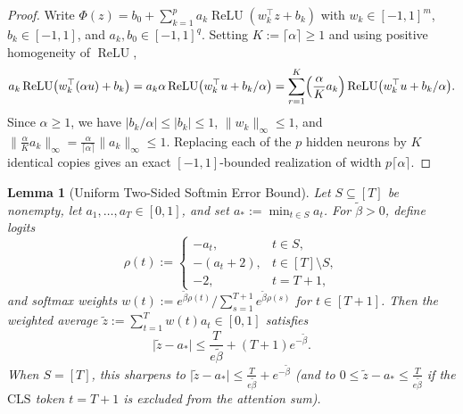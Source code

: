 \documentclass[11pt]{article}
\theoremstyle{plain}
\newtheorem{lemma}{Lemma}
\theoremstyle{definition}
\theoremstyle{remark}
\DeclareMathOperator{\ReLU}{ReLU}
\newcommand{\1}{\mathbf{1}}
\newcommand{\CLS}{\mathrm{CLS}}
\begin{document}
\begin{proof}
Write $\Phi(z) = b_0 + \sum_{k=1}^p a_k \ReLU(w_k^\top z + b_k)$ with $w_k \in [-1,1]^m$, $b_k \in [-1,1]$, and $a_k, b_0 \in [-1,1]^q$. Setting $K := \lceil \alpha \rceil \ge 1$ and using positive homogeneity of $\ReLU$,
\[
a_k \ReLU\bigl(w_k^\top(\alpha u) + b_k\bigr)
= a_k \alpha \ReLU\bigl(w_k^\top u + b_k/\alpha\bigr)
= \sum_{r=1}^K \Bigl(\frac{\alpha}{K} a_k\Bigr) \ReLU\bigl(w_k^\top u + b_k/\alpha\bigr).
\]
Since $\alpha \ge 1$, we have $|b_k/\alpha| \le |b_k| \le 1$, $\|w_k\|_\infty \le 1$, and $\|\frac{\alpha}{K} a_k\|_\infty = \frac{\alpha}{\lceil \alpha \rceil}\|a_k\|_\infty \le 1$. Replacing each of the $p$ hidden neurons by $K$ identical copies gives an exact $[-1,1]$-bounded realization of width $p\lceil \alpha \rceil$.
\end{proof}

\begin{lemma}[Uniform Two-Sided Softmin Error Bound]\label{lem:softmin}
Let $S \subseteq [T]$ be nonempty, let $a_1, \dots, a_T \in [0,1]$, and set $a_* := \min_{t \in S} a_t$. For $\tilde{\beta} > 0$, define logits
\[
\rho(t) := \begin{cases}
-a_t, & t \in S, \\
-(a_t + 2), & t \in [T] \setminus S, \\
-2, & t = T + 1,
\end{cases}
\]
and softmax weights $w(t) := e^{\tilde{\beta}\rho(t)} \big/ \sum_{s=1}^{T+1} e^{\tilde{\beta}\rho(s)}$ for $t \in [T+1]$. Then the weighted average $\tilde{z} := \sum_{t=1}^T w(t) a_t \in [0,1]$ satisfies
\[
\bigl|\tilde{z} - a_*\bigr| \le \frac{T}{e\tilde{\beta}} + (T + 1)e^{-\tilde{\beta}}.
\]
When $S = [T]$, this sharpens to $\bigl|\tilde{z} - a_*\bigr| \le \frac{T}{e\tilde{\beta}} + e^{-\tilde{\beta}}$ (and to $0 \le \tilde{z} - a_* \le \frac{T}{e\tilde{\beta}}$ if the $\CLS$ token $t = T+1$ is excluded from the attention sum).
\end{lemma}
\end{document}
